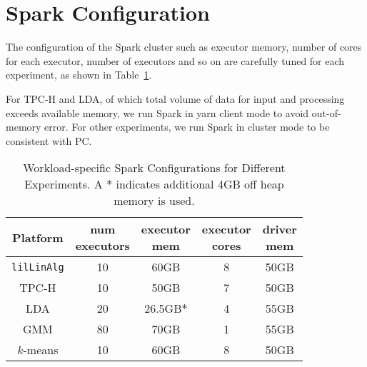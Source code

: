 \section{Spark Configuration}
\label{sec:spark}

The configuration of the Spark cluster such as
executor memory, number of cores for each executor, number of
executors and so on are carefully tuned for each
experiment, as shown in Table~\ref{fig:sparkConf}.

For TPC-H and LDA, of which total volume of data for input and
processing exceeds available memory, we run Spark in yarn client
mode to avoid out-of-memory error. For other experiments, we run Spark
in cluster mode to be consistent with PC.

\begin{table}[H]
\begin{center}
\begin{tabular}{|c||c|c|c|c|}
\hline
Platform & \makecell{num\\executors} & \makecell{executor \\mem} & \makecell{executor \\cores}& \makecell{driver \\mem}\\
\hline
\texttt{lilLinAlg} &10 & 60GB & 8 & 50GB \\
TPC-H &10 & 50GB & 7 & 50GB \\
LDA &20 & 26.5GB$*$ &4 & 55GB\\
GMM&80 & 70GB & 1 & 55GB\\
$k$-means &10 &60GB & 8 & 50GB\\
\hline
\end{tabular}
\caption{Workload-specific Spark Configurations for Different
  Experiments. A $*$ indicates additional 4GB off heap memory is used.}
\label{fig:sparkConf}
\end{center}
\end{table}
